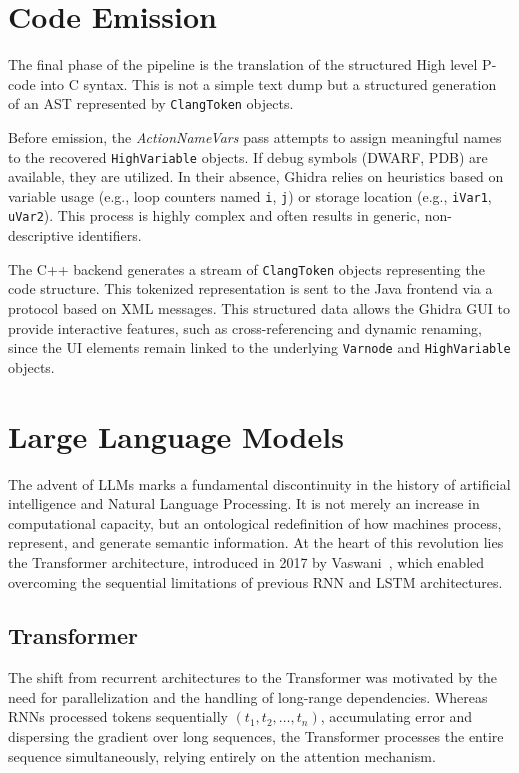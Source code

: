 \section{Code Emission}\label{sec:c_emission}

The final phase of the pipeline is the translation of the structured High level P-code into C syntax. 
This is not a simple text dump but a structured generation of an \ac{AST} represented 
by \texttt{ClangToken} objects.

Before emission, the \emph{ActionNameVars} pass attempts to assign meaningful names to the 
recovered \texttt{HighVariable} objects. If debug symbols (DWARF, PDB) are available, 
they are utilized. In their absence, Ghidra relies on heuristics based on variable usage 
(e.g., loop counters named \texttt{i}, \texttt{j}) or storage location 
(e.g., \texttt{iVar1}, \texttt{uVar2}). This process is highly complex and often results in generic, 
non-descriptive identifiers.

The C++ backend generates a stream of \texttt{ClangToken} objects representing the code structure. This tokenized representation is 
sent to the Java frontend via a protocol based on XML messages. This structured data allows the Ghidra 
\ac{GUI} to provide interactive features, such as cross-referencing and dynamic renaming, since the UI 
elements remain linked to the underlying \texttt{Varnode} and \texttt{HighVariable} objects.

\section{Large Language Models}\label{sec:llm}
The advent of \acp{LLM} marks a fundamental discontinuity in the history of artificial intelligence and Natural Language Processing. It is not merely an increase in computational capacity, 
but an ontological redefinition of how machines process, represent, and generate semantic information. 
At the heart of this revolution lies the Transformer architecture, introduced in 2017 by Vaswani~\cite{Paper:NIPS2017_3f5ee243}, which enabled overcoming the sequential 
limitations of previous \ac{RNN} and \ac{LSTM} architectures.

\subsection{Transformer}
The shift from recurrent architectures to the Transformer was motivated by the need for parallelization 
and the handling of long-range dependencies. Whereas \ac{RNN}s processed tokens sequentially $(t_1, t_2, \dots, t_n)$, 
accumulating error and dispersing the gradient over long sequences, the Transformer processes the entire sequence simultaneously, 
relying entirely on the attention mechanism.

